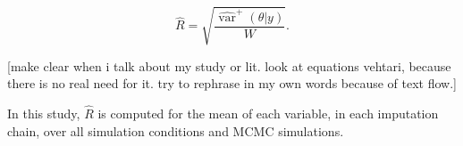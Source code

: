 \documentclass[article]{jss}
\begin{document}
\begin{equation*}
\widehat{R}=\sqrt{\frac{\widehat{\operatorname{var}}^{+}(\theta | y)}{W}}.
\end{equation*}

[make clear when i talk about my study or lit. look at equations vehtari, because there is no real need for it. try to rephrase in my own words because of text flow.]


In this study, $\widehat{R}$ is computed for the mean of each variable, in each imputation chain, over all simulation conditions and MCMC simulations. %


% 
% 
% 
% 
% 
\end{document}
